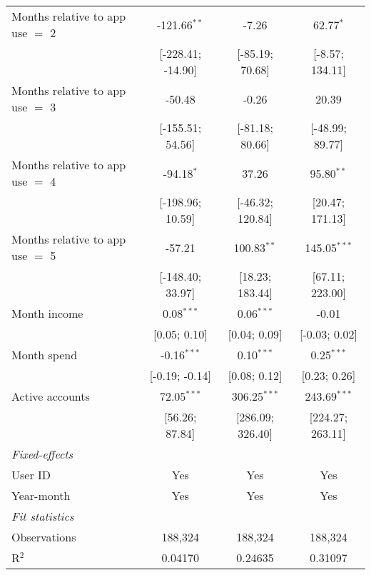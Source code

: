 \begin{table}[htbp]
\begin{threeparttable}[b]
\begin{tabular}{lccc}
         Months relative to app use $=$ 2  & -121.66$^{**}$    & -7.26            & 62.77$^{*}$\\   
                                           & [-228.41; -14.90] & [-85.19; 70.68]  & [-8.57; 134.11]\\   
         Months relative to app use $=$ 3  & -50.48            & -0.26            & 20.39\\   
                                           & [-155.51; 54.56]  & [-81.18; 80.66]  & [-48.99; 89.77]\\   
         Months relative to app use $=$ 4  & -94.18$^{*}$      & 37.26            & 95.80$^{**}$\\   
                                           & [-198.96; 10.59]  & [-46.32; 120.84] & [20.47; 171.13]\\   
         Months relative to app use $=$ 5  & -57.21            & 100.83$^{**}$    & 145.05$^{***}$\\   
                                           & [-148.40; 33.97]  & [18.23; 183.44]  & [67.11; 223.00]\\   
         Month income                      & 0.08$^{***}$      & 0.06$^{***}$     & -0.01\\   
                                           & [0.05; 0.10]      & [0.04; 0.09]     & [-0.03; 0.02]\\   
         Month spend                       & -0.16$^{***}$     & 0.10$^{***}$     & 0.25$^{***}$\\   
                                           & [-0.19; -0.14]    & [0.08; 0.12]     & [0.23; 0.26]\\   
         Active accounts                   & 72.05$^{***}$     & 306.25$^{***}$   & 243.69$^{***}$\\   
                                           & [56.26; 87.84]    & [286.09; 326.40] & [224.27; 263.11]\\   
         \midrule
         \emph{Fixed-effects}\\
         User ID                           & Yes               & Yes              & Yes\\  
         Year-month                        & Yes               & Yes              & Yes\\  
         \midrule
         \emph{Fit statistics}\\
         Observations                      & 188,324           & 188,324          & 188,324\\  
         R$^2$                             & 0.04170           & 0.24635          & 0.31097\\  

\end{tabular}
\end{threeparttable}
\end{table}
